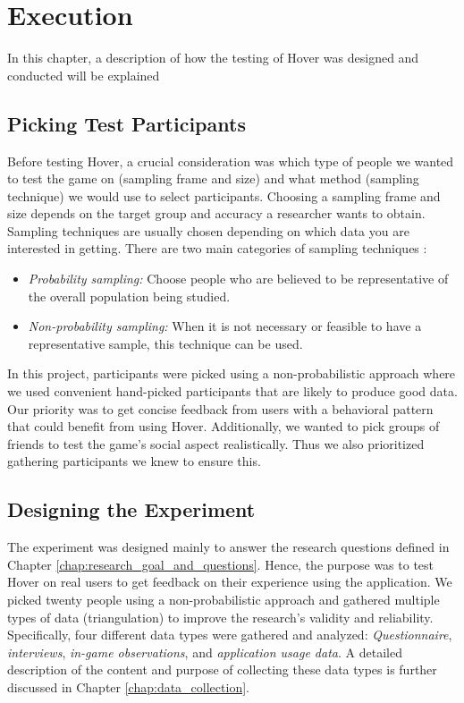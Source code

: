 \section{Execution}
\label{chap:execution}
In this chapter, a description of how the testing of Hover was designed and conducted will be explained

\subsection{Picking Test Participants}
Before testing Hover, a crucial consideration was which type of people we wanted to test the game on (sampling frame and size) and what method (sampling technique) we would use to select participants. Choosing a sampling frame and size depends on the target group and accuracy a researcher wants to obtain. Sampling techniques are usually chosen depending on which data you are interested in getting. There are two main categories of sampling techniques \citeauthor{oates_researching_2006}:

\begin{itemize}
    \item \textit{Probability sampling:} Choose people who are believed to be representative of the overall population being studied.
    \item \textit{Non-probability sampling:} When it is not necessary or feasible to have a representative sample, this technique can be used.
\end{itemize}

In this project, participants were picked using a non-probabilistic approach where we used convenient hand-picked participants that are likely to produce good data. Our priority was to get concise feedback from users with a behavioral pattern that could benefit from using Hover. Additionally, we wanted to pick groups of friends to test the game’s social aspect realistically. Thus we also prioritized gathering participants we knew to ensure this.

\subsection{Designing the Experiment}
The experiment was designed mainly to answer the research questions defined in Chapter \ref{chap:research_goal_and_questions}. Hence, the purpose was to test Hover on real users to get feedback on their experience using the application. We picked twenty people using a non-probabilistic approach and gathered multiple types of data (triangulation) to improve the research’s validity and reliability. Specifically, four different data types were gathered and analyzed: \textit{Questionnaire}, \textit{interviews}, \textit{in-game observations}, and \textit{application usage data}. A detailed description of the content and purpose of collecting these data types is further discussed in Chapter \ref{chap:data_collection}.

